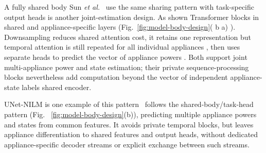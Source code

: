 \documentclass[journal]{IEEEtran}
\providecommand{\DIFadd}[1]{{\protect\color{blue} \sf #1}} %
\providecommand{\DIFdel}[1]{{\protect\color{red} \scriptsize #1}} %
\providecommand{\DIFaddbegin}{} %
\providecommand{\DIFaddend}{} %
\providecommand{\DIFdelbegin}{} %
\providecommand{\DIFdelend}{} %
\providecommand{\DIFscaledelfig}{0.5}
\newlength{\DIFdelgraphicswidth} %
\newlength{\DIFdelgraphicsheight} %
\providecommand{\DIFaddincludegraphics}[2][]{{\color{blue}\fbox{\DIFOincludegraphics[#1]{#2}}}} %
\providecommand{\DIFdelincludegraphics}[2][]{%
\sbox{\DIFdelgraphicsbox}{\DIFOincludegraphics[#1]{#2}}%
\settoboxwidth{\DIFdelgraphicswidth}{\DIFdelgraphicsbox} %
\settoboxtotalheight{\DIFdelgraphicsheight}{\DIFdelgraphicsbox} %
\scalebox{\DIFscaledelfig}{%
\parbox[b]{\DIFdelgraphicswidth}{\usebox{\DIFdelgraphicsbox}\\[-\baselineskip] \rule{\DIFdelgraphicswidth}{0em}}\llap{\resizebox{\DIFdelgraphicswidth}{\DIFdelgraphicsheight}{%
\setlength{\unitlength}{\DIFdelgraphicswidth}%
\begin{picture}(1,1)%
\thicklines\linethickness{2pt} %
{\color[rgb]{1,0,0}\put(0,0){\framebox(1,1){}}}%
{\color[rgb]{1,0,0}\put(0,0){\line( 1,1){1}}}%
{\color[rgb]{1,0,0}\put(0,1){\line(1,-1){1}}}%
\end{picture}%
}\hspace*{3pt}}} %
} %
\DeclareRobustCommand{\DIFaddbegin}{\DIFOaddbegin \let\includegraphics\DIFaddincludegraphics} %
\DeclareRobustCommand{\DIFaddend}{\DIFOaddend \let\includegraphics\DIFOincludegraphics} %
\DeclareRobustCommand{\DIFdelbegin}{\DIFOdelbegin \let\includegraphics\DIFdelincludegraphics} %
\DeclareRobustCommand{\DIFdelend}{\DIFOaddend \let\includegraphics\DIFOincludegraphics} %
\begin{document}
\DIFdel{A fully shared body }\DIFdelend \DIFaddbegin \DIFadd{Sun \emph{et al.}~\cite{sun2025transfer} use the same sharing pattern }\DIFaddend with \DIFdelbegin \DIFdel{task-specific output heads is another joint-estimation design. As shown }\DIFdelend \DIFaddbegin \DIFadd{Transformer blocks }\DIFaddend in \DIFaddbegin \DIFadd{shared and appliance-specific layers (}\DIFaddend Fig.~\ref{fig:model-body-design}(\DIFdelbegin \DIFdel{b}\DIFdelend \DIFaddbegin \DIFadd{a}\DIFaddend )\DIFaddbegin \DIFadd{). Downsampling reduces shared attention cost}\DIFaddend , \DIFdelbegin \DIFdel{it retains one representation }\DIFdelend \DIFaddbegin \DIFadd{but temporal attention is still repeated }\DIFaddend for \DIFdelbegin \DIFdel{all }\DIFdelend \DIFaddbegin \DIFadd{individual }\DIFaddend appliances\DIFdelbegin \DIFdel{, then uses separate heads to predict the vector of appliance powers }\DIFdelend \DIFaddbegin \DIFadd{. Both support joint multi-appliance power }\DIFaddend and \DIFaddbegin \DIFadd{state estimation; their private sequence-processing blocks nevertheless add computation beyond }\DIFaddend the \DIFdelbegin \DIFdel{vector of independent appliance-state labels}\DIFdelend \DIFaddbegin \DIFadd{shared encoder}\DIFaddend .
\DIFaddbegin 

\DIFaddend UNet-NILM\DIFdelbegin \DIFdel{is one example of this pattern}\DIFdelend ~\cite{faustine2020unet} \DIFaddbegin \DIFadd{follows the shared-body/task-head pattern (Fig}\DIFaddend .\DIFaddbegin \DIFadd{~\ref{fig:model-body-design}(b)), predicting multiple appliance powers and states from common features. It avoids private temporal blocks, but leaves appliance differentiation to shared features and output heads, without dedicated appliance-specific decoder streams or explicit exchange between such streams.
}\DIFaddend 
\end{document}
